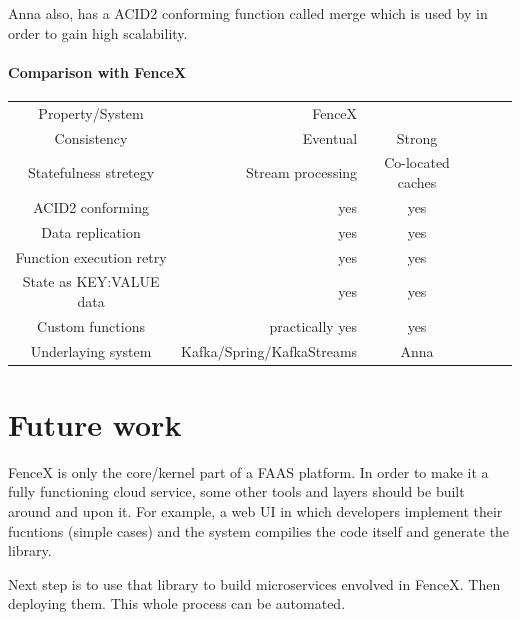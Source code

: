\documentclass[a4]{report}
\begin{document}
    Anna also, has a ACID2 conforming function called merge which is used by \cite{Functions-as-a-Service-2020} in
    order to gain high scalability.

    \paragraph{Comparison with FenceX}
    \begin{center}
        \begin{tabular}{ cr cr cr}
            Property/System  & FenceX  &    \cite{Functions-as-a-Service-2020} \\
            Consistency  & Eventual  &  Strong  \\
            Statefulness stretegy  & Stream processing  &  Co-located caches  \\
            ACID2 conforming  & yes  &  yes  \\
            Data replication  & yes  &  yes  \\
            Function execution retry  & yes  &  yes  \\
            State as KEY:VALUE data  & yes  &  yes  \\
            Custom functions  & practically yes  &  yes  \\
            Underlaying system  & Kafka/Spring/KafkaStreams  &  Anna  \\
        \end{tabular}
    \end{center}

    \section{Future work}
    FenceX is only the core/kernel part of a FAAS platform.
    In order to make it a fully functioning cloud service, some other tools and layers should be built around and
    upon it.
    For example, a web UI in which developers implement their fucntions (simple cases) and the system compilies
    the code itself and generate the library.

    Next step is to use that library to build microservices envolved in FenceX.
    Then deploying them.
    This whole process can be automated.

    \nocite{*}
    
    
\end{document}
